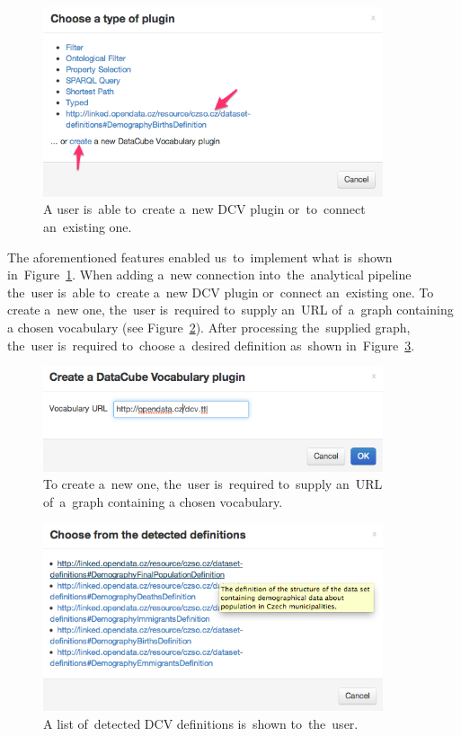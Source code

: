 \begin{figure}
	\centering
	\includegraphics[width=100mm]{img/choose-plugin.png}
	\caption{A user is~able to~create a~new DCV plugin or~to~connect an~existing one.}
	\label{fig:choose-plugin}
\end{figure}

The aforementioned features enabled us~to~implement what is~shown in~Figure~\ref{fig:choose-plugin}. When adding a~new connection into~the~analytical 
pipeline the~user is~able to~create a~new DCV plugin or~connect an~existing one. 
To create a~new one, the~user is~required to~supply an~URL of~a~graph containing 
a chosen vocabulary (see Figure~\ref{fig:create-plugin}). After processing the~supplied graph, the~user is~required to~choose a~desired definition as~shown in~Figure~\ref{fig:choose-def}.

\begin{figure}
	\centering
	\includegraphics[width=100mm]{img/create-dcv.png}
	\caption{To create a~new one, the~user is~required to~supply an~URL of~a~graph containing 
a chosen vocabulary.}
	\label{fig:create-plugin}
\end{figure}


\begin{figure}
	\centering
	\includegraphics[width=100mm]{img/choose-def.png}
	\caption{A list of~detected DCV definitions is~shown to~the~user.}
	\label{fig:choose-def}
\end{figure}

